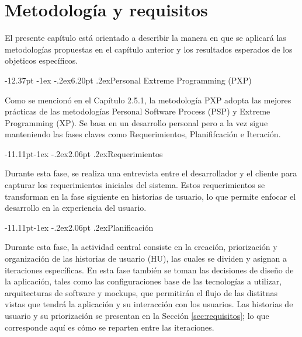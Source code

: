 \documentclass[12pt,letterpaper,oneside]{report}
\makeatletter
\renewcommand\section{\@startsection{section}{1}{\z@}%
  {-12.37pt \@plus -1ex \@minus -.2ex}{6.20pt \@plus.2ex}{\normalfont\large\bfseries}}
\renewcommand\subsection{\@startsection{subsection}{2}{\z@}%
  {-11.11pt\@plus -1ex \@minus -.2ex}{2.06pt \@plus .2ex}{\normalfont\normalsize\bfseries}}
\makeatother
\begin{document}
\chapter{Metodología y requisitos}

El presente capítulo está orientado a describir la manera en que se aplicará las metodologías propuestas en el capítulo anterior y los resultados esperados de los objeticos específicos.

\section{Personal Extreme Programming (PXP)}

Como se mencionó en el Capítulo 2.5.1, la metodología PXP adopta las mejores prácticas de las metodologías Personal Software Process (PSP) y Extreme Programming (XP). Se basa en un desarrollo personal pero a la vez sigue manteniendo las fases claves como Requerimientos, Planififcación e Iteración.

\subsection{Requerimientos }
\label{sec:requerimientos}

Durante esta fase, se realiza una entrevista entre el desarrollador y el cliente para capturar los requerimientos iniciales del sistema. Estos requerimientos se transforman en la fase siguiente en historias de usuario, lo que permite enfocar el desarrollo en la experiencia del usuario.

\subsection{Planificación}

Durante esta fase, la actividad central consiste en la creación, priorización y organización de las historias de usuario (HU), las cuales se dividen y asignan a iteraciones específicas. En esta fase también se toman las decisiones de diseño de la aplicación, tales como las configuraciones base de las tecnologías a utilizar, arquitecturas de software y mockups, que permitirán el flujo de las distitnas vistas que tendrá la aplicación y su interacción con los usuarios. Las historias de usuario y su priorización se presentan en la Sección \ref{sec:requisitos}; lo que corresponde aquí es cómo se reparten entre las iteraciones.
\end{document}
